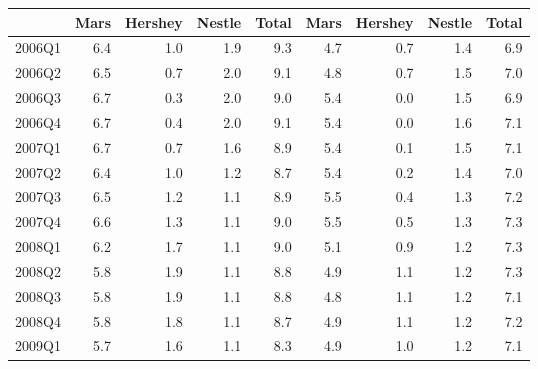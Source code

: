 \begin{tabular}{l rrrr | rrrr}
\toprule
{} &  Mars &  Hershey &  Nestle &  Total &  Mars &  Hershey &  Nestle &  Total \\
\midrule
2006Q1 &   6.4 &      1.0 &     1.9 &    9.3 &   4.7 &      0.7 &     1.4 &    6.9 \\
2006Q2 &   6.5 &      0.7 &     2.0 &    9.1 &   4.8 &      0.7 &     1.5 &    7.0 \\
2006Q3 &   6.7 &      0.3 &     2.0 &    9.0 &   5.4 &      0.0 &     1.5 &    6.9 \\
2006Q4 &   6.7 &      0.4 &     2.0 &    9.1 &   5.4 &      0.0 &     1.6 &    7.1 \\
2007Q1 &   6.7 &      0.7 &     1.6 &    8.9 &   5.4 &      0.1 &     1.5 &    7.1 \\
2007Q2 &   6.4 &      1.0 &     1.2 &    8.7 &   5.4 &      0.2 &     1.4 &    7.0 \\
2007Q3 &   6.5 &      1.2 &     1.1 &    8.9 &   5.5 &      0.4 &     1.3 &    7.2 \\
2007Q4 &   6.6 &      1.3 &     1.1 &    9.0 &   5.5 &      0.5 &     1.3 &    7.3 \\
2008Q1 &   6.2 &      1.7 &     1.1 &    9.0 &   5.1 &      0.9 &     1.2 &    7.3 \\
2008Q2 &   5.8 &      1.9 &     1.1 &    8.8 &   4.9 &      1.1 &     1.2 &    7.3 \\
2008Q3 &   5.8 &      1.9 &     1.1 &    8.8 &   4.8 &      1.1 &     1.2 &    7.1 \\
2008Q4 &   5.8 &      1.8 &     1.1 &    8.7 &   4.9 &      1.1 &     1.2 &    7.2 \\
2009Q1 &   5.7 &      1.6 &     1.1 &    8.3 &   4.9 &      1.0 &     1.2 &    7.1 \\
\bottomrule
\end{tabular}
